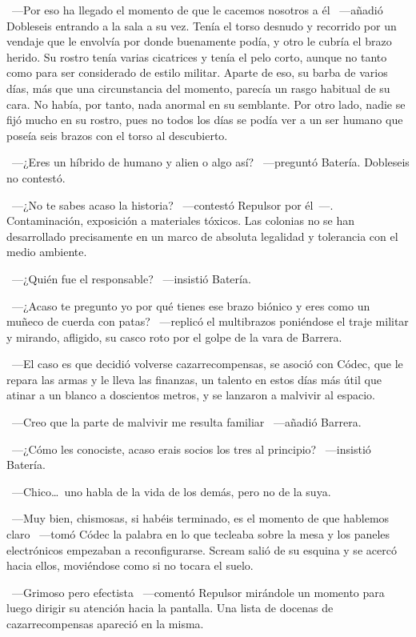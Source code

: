 ~---Por eso ha llegado el momento de que le cacemos nosotros a él ~---añadió Dobleseis entrando a la sala a su vez. Tenía el torso desnudo y recorrido por un vendaje que le envolvía por donde buenamente podía, y otro le cubría el brazo herido. Su rostro tenía varias cicatrices y tenía el pelo corto, aunque no tanto como para ser considerado de estilo militar. Aparte de eso, su barba de varios días, más que una circunstancia del momento, parecía un rasgo habitual de su cara. No había, por tanto, nada anormal en su semblante. Por otro lado, nadie se fijó mucho en su rostro, pues no todos los días se podía ver a un ser humano que poseía seis brazos con el torso al descubierto.

~---¿Eres un híbrido de humano y alien o algo así? ~---preguntó Batería. Dobleseis no contestó.

~---¿No te sabes acaso la historia? ~---contestó Repulsor por él~---. Contaminación, exposición a materiales tóxicos. Las colonias no se han desarrollado precisamente en un marco de absoluta legalidad y tolerancia con el medio ambiente.

~---¿Quién fue el responsable? ~---insistió Batería.

~---¿Acaso te pregunto yo por qué tienes ese brazo biónico y eres como un muñeco de cuerda con patas? ~---replicó el multibrazos poniéndose el traje militar y mirando, afligido, su casco roto por el golpe de la vara de Barrera.

~---El caso es que decidió volverse cazarrecompensas, se asoció con Códec, que le repara las armas y le lleva las finanzas, un talento en estos días más útil que atinar a un blanco a doscientos metros, y se lanzaron a malvivir al espacio.

~---Creo que la parte de malvivir me resulta familiar ~---añadió Barrera.

~---¿Cómo les conociste, acaso erais socios los tres al principio? ~---insistió Batería.

~---Chico\dots\ uno habla de la vida de los demás, pero no de la suya.

~---Muy bien, chismosas, si habéis terminado, es el momento de que hablemos claro ~---tomó Códec la palabra en lo que tecleaba sobre la mesa y los paneles electrónicos empezaban a reconfigurarse. Scream salió de su esquina y se acercó hacia ellos, moviéndose como si no tocara el suelo.

~---Grimoso pero efectista ~---comentó Repulsor mirándole un momento para luego dirigir su atención hacia la pantalla. Una lista de docenas de cazarrecompensas apareció en la misma.

